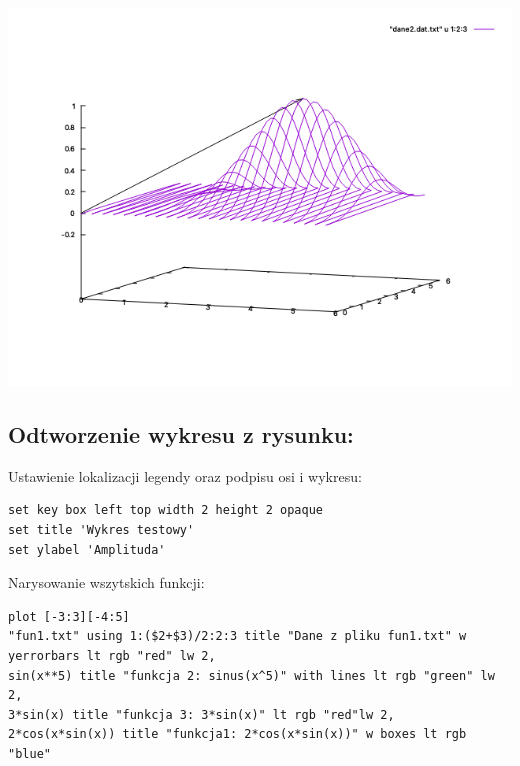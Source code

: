 \documentclass[5]{article}
\begin{document}
\begin{center}
    \includegraphics[scale=0.6]{zad3_with_arrow.png} \par
    \vspace{3mm}
\end{center}

\subsection{Odtworzenie wykresu z rysunku: }

\hspace{4mm} Ustawienie lokalizacji legendy oraz podpisu osi i wykresu: 
\begin{verbatim}
set key box left top width 2 height 2 opaque
set title 'Wykres testowy'
set ylabel 'Amplituda'
\end{verbatim}

Narysowanie wszytskich funkcji: 
\begin{verbatim}
plot [-3:3][-4:5]
"fun1.txt" using 1:($2+$3)/2:2:3 title "Dane z pliku fun1.txt" w yerrorbars lt rgb "red" lw 2,
sin(x**5) title "funkcja 2: sinus(x^5)" with lines lt rgb "green" lw 2,
3*sin(x) title "funkcja 3: 3*sin(x)" lt rgb "red"lw 2,
2*cos(x*sin(x)) title "funkcja1: 2*cos(x*sin(x))" w boxes lt rgb "blue"
\end{verbatim}
\end{document}
